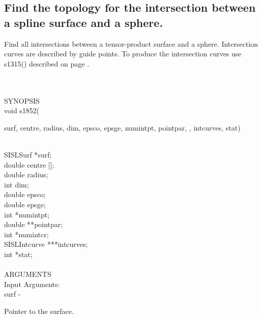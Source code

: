 \subsection{Find the topology for the intersection between a spline surface and a sphere.}
\begin{minipg1}
  Find all intersections between a tensor-product surface and a sphere.
  Intersection curves are described by guide points.
  To produce the intersection curves use s1315() described on page \pageref{s1315}.
\end{minipg1} \\ \\
SYNOPSIS\\
        \>void s1852(\begin{minipg3}
                {\fov surf}, {\fov centre}, {\fov radius}, {\fov dim}, {\fov epsco}, {\fov epsge}, {\fov numintpt},
                {\fov pointpar}, ,
                {\fov intcurves}, {\fov stat})
                \end{minipg3}\\[0.3ex]
                \>\>    SISLSurf        \>      *{\fov surf};\\
                \>\>    double  \>      {\fov centre} [];\\
                \>\>    double  \>      {\fov radius};\\
                \>\>    int     \>      {\fov dim};\\
                \>\>    double  \>      {\fov epsco};\\
                \>\>    double  \>      {\fov epsge};\\
                \>\>    int     \>      *{\fov numintpt};\\
                \>\>    double  \>      **{\fov pointpar};\\
                \>\>    int     \>      *{\fov numintcr};\\
                \>\>    SISLIntcurve\>  ***{\fov intcurves};\\
                \>\>    int     \>      *{\fov stat};\\
\\
ARGUMENTS\\
        \>Input Arguments:\\
        \>\>    {\fov surf}\> - \>              \begin{minipg2}
                                Pointer to the surface.
                                \end{minipg2}\\
